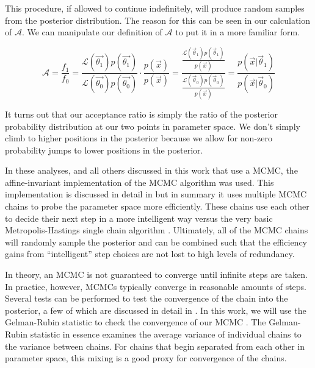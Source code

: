 This procedure, if allowed to continue indefinitely, will produce random samples from the posterior distribution.  The reason for this can be seen in our calculation of $\mathcal{A}$.  We can manipulate our definition of $\mathcal{A}$ to put it in a more familiar form.

\begin{equation}
        \mathcal{A} = \frac{f_1}{f_0} = \frac{\mathcal{L}(\vec{\theta_1}) p(\vec{\theta_1})}{\mathcal{L}(\vec{\theta_0}) p(\vec{\theta_0})} \cdot \frac{p(\vec{x})}{p(\vec{x})} = \frac{\frac{\mathcal{L}(\vec{\theta}_1) p(\vec{\theta}_1)}{p(\vec{x})}}{\frac{\mathcal{L}(\vec{\theta}_0) p(\vec{\theta}_0)}{p(\vec{x})}} = \frac{p(\vec{x}|\vec{\theta}_1)}{p(\vec{x}|\vec{\theta}_0)}
\end{equation}

It turns out that our acceptance ratio is simply the ratio of the posterior probability distribution at our two points in parameter space.  We don't simply climb to higher positions in the posterior because we allow for non-zero probability jumps to lower positions in the posterior.

In these analyses, and all others discussed in this work that use a MCMC, the affine-invariant implementation of the MCMC algorithm was used.  This implementation is discussed in detail in  but in summary it uses multiple MCMC chains to probe the parameter space more efficiently.  These chains use each other to decide their next step in a more intelligent way versus the very basic Metropolis-Hastings single chain algorithm \cite{chib1995understanding}.  Ultimately, all of the MCMC chains will randomly sample the posterior and can be combined such that the efficiency gains from ``intelligent'' step choices are not lost to high levels of redundancy.

In theory, an MCMC is not guaranteed to converge until infinite steps are taken.  In practice, however, MCMCs typically converge in reasonable amounts of steps.  Several tests can be performed to test the convergence of the chain into the posterior, a few of which are discussed in detail in .  In this work, we will use the Gelman-Rubin statistic to check the convergence of our MCMC \cite{gelman1992inference}.  The Gelman-Rubin statistic in essence examines the average variance of individual chains to the variance between chains.  For chains that begin separated from each other in parameter space, this mixing is a good proxy for convergence of the chains.

